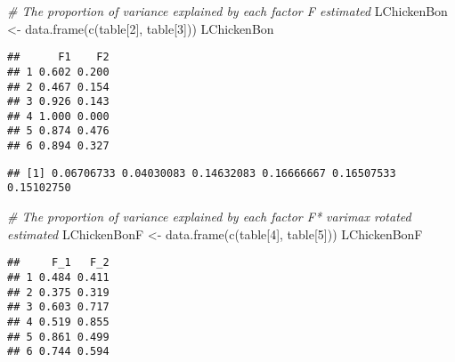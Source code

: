 \documentclass[
]{article}
\newenvironment{Shaded}{\begin{snugshade}}{\end{snugshade}}
\newcommand{\CommentTok}[1]{\textcolor[rgb]{0.56,0.35,0.01}{\textit{#1}}}
\newcommand{\DecValTok}[1]{\textcolor[rgb]{0.00,0.00,0.81}{#1}}
\newcommand{\FunctionTok}[1]{\textcolor[rgb]{0.00,0.00,0.00}{#1}}
\newcommand{\NormalTok}[1]{#1}
\newcommand{\OtherTok}[1]{\textcolor[rgb]{0.56,0.35,0.01}{#1}}
\newcommand{\SpecialCharTok}[1]{\textcolor[rgb]{0.00,0.00,0.00}{#1}}
\begin{document}
\begin{Shaded}
\begin{Highlighting}[]
\CommentTok{\# The proportion of variance explained by each factor F estimated}
\NormalTok{LChickenBon }\OtherTok{\textless{}{-}} \FunctionTok{data.frame}\NormalTok{(}\FunctionTok{c}\NormalTok{(table[}\DecValTok{2}\NormalTok{], table[}\DecValTok{3}\NormalTok{]))}
\NormalTok{LChickenBon}
\end{Highlighting}
\end{Shaded}

\begin{verbatim}
##      F1    F2
## 1 0.602 0.200
## 2 0.467 0.154
## 3 0.926 0.143
## 4 1.000 0.000
## 5 0.874 0.476
## 6 0.894 0.327
\end{verbatim}

\begin{Shaded}
\end{Shaded}

\begin{verbatim}
## [1] 0.06706733 0.04030083 0.14632083 0.16666667 0.16507533 0.15102750
\end{verbatim}

\begin{Shaded}
\begin{Highlighting}[]
\CommentTok{\# The proportion of variance explained by each factor F* varimax rotated estimated}
\NormalTok{LChickenBonF }\OtherTok{\textless{}{-}} \FunctionTok{data.frame}\NormalTok{(}\FunctionTok{c}\NormalTok{(table[}\DecValTok{4}\NormalTok{], table[}\DecValTok{5}\NormalTok{]))}
\NormalTok{LChickenBonF}
\end{Highlighting}
\end{Shaded}

\begin{verbatim}
##     F_1   F_2
## 1 0.484 0.411
## 2 0.375 0.319
## 3 0.603 0.717
## 4 0.519 0.855
## 5 0.861 0.499
## 6 0.744 0.594
\end{verbatim}

\begin{Shaded}
\end{Shaded}
\end{document}
